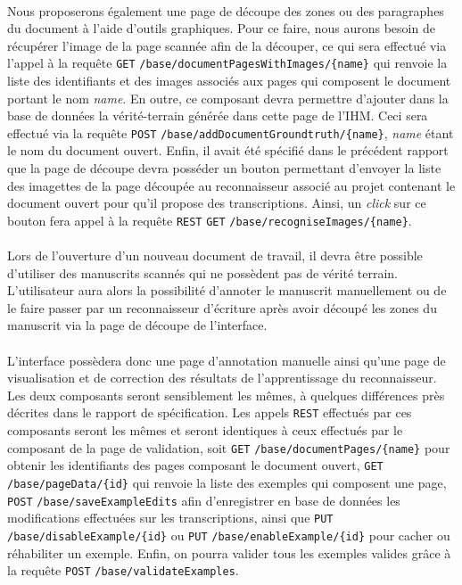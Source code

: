 \paragraph{}
Nous proposerons également une page de découpe des zones ou des paragraphes du document à l’aide d’outils graphiques. Pour ce faire, nous aurons besoin de récupérer l'image de la page scannée afin de la découper, ce qui sera effectué via l'appel à la requête \texttt{GET} \texttt{/base/documentPagesWithImages/\{name\}} qui renvoie la liste des identifiants et des images associés aux pages qui composent le document portant le nom \textit{name}. En outre, ce composant devra permettre d'ajouter dans la base de données la vérité-terrain générée dans cette page de l'IHM. Ceci sera effectué via la requête \texttt{POST} \texttt{/base/addDocumentGroundtruth/\{name\}}, \textit{name} étant le nom du document ouvert. Enfin, il avait été spécifié dans le précédent rapport que la page de découpe devra posséder un bouton permettant d'envoyer la liste des imagettes de la page découpée au reconnaisseur associé au projet contenant le document ouvert pour qu'il propose des transcriptions. Ainsi, un \textit{click} sur ce bouton fera appel à la requête \texttt{REST} \texttt{GET} \texttt{/base/recogniseImages/\{name\}}.

\paragraph{}
Lors de l’ouverture d’un nouveau document de travail, il devra être possible d’utiliser des manuscrits scannés qui ne possèdent pas de vérité terrain. L’utilisateur aura alors la possibilité d’annoter le manuscrit manuellement ou de le faire passer par un reconnaisseur d’écriture après avoir découpé les zones du manuscrit via la page de découpe de l’interface.

\paragraph{}
L’interface possèdera donc une page d’annotation manuelle ainsi qu'une page de visualisation et de correction des résultats de l'apprentissage du reconnaisseur. Les deux composants seront sensiblement les mêmes, à quelques différences près décrites dans le rapport de spécification.
\newline{}
Les appels \texttt{REST} effectués par ces composants seront les mêmes et seront identiques à ceux effectués par le composant de la page de validation, soit \texttt{GET} \texttt{/base/documentPages/\{name\}} pour obtenir les identifiants des pages composant le document ouvert, \texttt{GET} \texttt{/base/pageData/\{id\}} qui renvoie la liste des exemples qui composent une page, \texttt{POST} \texttt{/base/saveExampleEdits} afin d'enregistrer en base de données les modifications effectuées sur les transcriptions, ainsi que \texttt{PUT} \texttt{/base/disableExample/\{id\}} ou \texttt{PUT} \texttt{/base/enableExample/\{id\}} pour cacher ou réhabiliter un exemple. Enfin, on pourra valider tous les exemples valides grâce à la requête \texttt{POST} \texttt{/base/validateExamples}.

